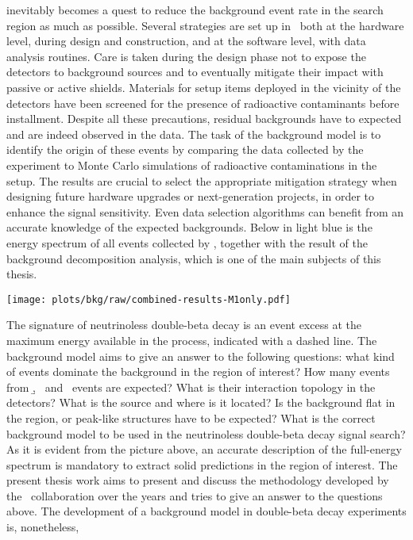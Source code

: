 inevitably becomes a quest to reduce the background event rate in the search region as
much as possible. Several strategies are set up in \gerda\ both at the hardware level,
during design and construction, and at the software level, with data analysis routines.
Care is taken during the design phase not to expose the detectors to background sources
and to eventually mitigate their impact with passive or active shields. Materials for
setup items deployed in the vicinity of the detectors have been screened for the presence
of radioactive contaminants before installment. Despite all these precautions, residual
backgrounds have to expected and are indeed observed in the data. The task of the
background model is to identify the origin of these events by comparing the data collected
by the experiment to Monte Carlo simulations of radioactive contaminations in the setup.
The results are crucial to select the appropriate mitigation strategy when designing
future hardware upgrades or next-generation projects, in order to enhance the signal
sensitivity. Even data selection algorithms can benefit from an accurate knowledge of the
expected backgrounds.  Below in light blue is the energy spectrum of all events collected
by \gerda, together with the result of the background decomposition analysis, which is one
of the main subjects of this thesis.
\begin{center}
  \vspace{11pt}
  \texttt{[image: plots/bkg/raw/combined-results-M1only.pdf]}
\end{center}
The signature of neutrinoless double-beta decay is an event excess at the maximum energy
available in the process, indicated with a dashed line. The background model aims to give
an answer to the following questions: what kind of events dominate the background in the
region of interest? How many events from \b, \g\ and \a\ events are expected? What is
their interaction topology in the detectors? What is the source and where is it located?
Is the background flat in the region, or peak-like structures have to be expected?  What
is the correct background model to be used in the neutrinoless double-beta decay signal
search? As it is evident from the picture above, an accurate description of the
full-energy spectrum is mandatory to extract solid predictions in the region of interest.
The present thesis work aims to present and discuss the methodology developed by the
\gerda\ collaboration over the years and tries to give an answer to the questions above.
\newpar
The development of a background model in double-beta decay experiments is, nonetheless,

